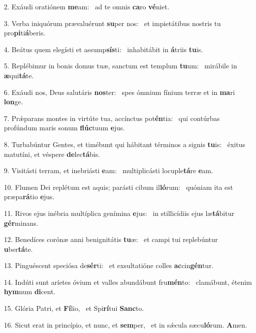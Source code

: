 2. Exáudi oratiónem \textbf{me}am: \ast\  ad te omnis \textbf{ca}ro \textbf{vé}niet.\

3. Verba iniquórum prævaluérunt \textbf{su}per nos: \ast\  et impietátibus nostris tu pro\textbf{pi}ti\textbf{á}beris.\

4. Beátus quem elegísti et assump\textbf{sís}ti: \ast\  inhabitábit in \textbf{á}triis \textbf{tu}is.\

5. Replébimur in bonis domus tuæ, sanctum est templum \textbf{tu}um: \ast\  mirábile in \textbf{æ}qui\textbf{tá}te.\

6. Exáudi nos, Deus salutáris \textbf{nos}ter: \ast\  spes ómnium fínium terræ et in \textbf{ma}ri \textbf{lon}ge.\

7. Prǽparans montes in virtúte tua, accínctus pot\textbf{én}tia: \ast\  qui contúrbas profúndum maris sonum \textbf{flúc}tuum \textbf{e}jus.\

8. Turbabúntur Gentes, et timébunt qui hábitant términos a signis \textbf{tu}is: \ast\  éxitus matutíni, et véspere \textbf{de}lec\textbf{tá}bis.\

9. Visitásti terram, et inebriásti \textbf{e}am: \ast\  multiplicásti locuple\textbf{tá}re \textbf{e}am.\

10. Flumen Dei replétum est aquis; parásti cibum il\textbf{ló}rum: \ast\  quóniam ita est præpa\textbf{rá}tio \textbf{e}jus.\

11. Rivos ejus inébria multíplica genímina \textbf{e}jus: \ast\  in stillicídiis ejus læ\textbf{tá}bitur \textbf{gér}minans.\

12. Benedíces corónæ anni benignitátis \textbf{tu}æ: \ast\  et campi tui replebúntur \textbf{u}ber\textbf{tá}te.\

13. Pinguéscent speciósa de\textbf{sér}ti: \ast\  et exsultatióne colles \textbf{ac}cin\textbf{gén}tur.\

14. Indúti sunt aríetes óvium et valles abundábunt fru\textbf{mén}to: \ast\  clamábunt, étenim \textbf{hym}num \textbf{di}cent.\

15. Glória Patri, et \textbf{Fí}lio, \ast\  et Spi\textbf{rí}tui \textbf{Sanc}to.\

16. Sicut erat in princípio, et nunc, et \textbf{sem}per, \ast\  et in sǽcula sæcu\textbf{ló}rum. \textbf{A}men.\

